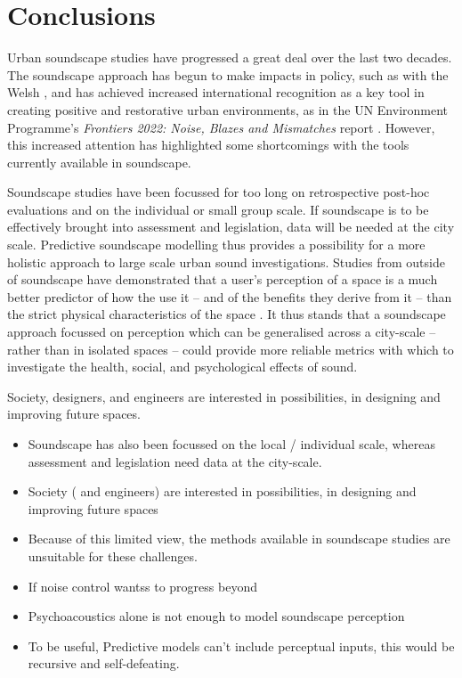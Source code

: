 \chapter{Conclusions}
\label{ch:conc}

Urban soundscape studies have progressed a great deal over the last two decades. The soundscape approach has begun to make impacts in policy, such as with the Welsh \citet{Welsh2018Noise}, and has achieved increased international recognition as a key tool in creating positive and restorative urban environments, as in the UN Environment Programme's \emph{Frontiers 2022: Noise, Blazes and Mismatches} report \citep{Aletta2022Frontiers}. However, this increased attention has highlighted some shortcomings with the tools currently available in soundscape. 

Soundscape studies have been focussed for too long on retrospective post-hoc evaluations and on the individual or small group scale. If soundscape is to be effectively brought into assessment and legislation, data will be needed at the city scale. Predictive soundscape modelling thus provides a possibility for a more holistic approach to large scale urban sound investigations. Studies from outside of soundscape have demonstrated that a user's perception of a space is a much better predictor of how the use it -- and of the benefits they derive from it -- than the strict physical characteristics of the space \citep{Kruize2019Exploring}. It thus stands that a soundscape approach focussed on perception which can be generalised across a city-scale -- rather than in isolated spaces -- could provide more reliable metrics with which to investigate the health, social, and psychological effects of sound.

Society, designers, and engineers are interested in possibilities, in designing and improving future spaces.




\begin{itemize}
  \item Soundscape has also been focussed on the local / individual scale, whereas assessment and legislation need data at the city-scale.
  \item Society ( and engineers) are interested in possibilities, in designing and improving future spaces
  \item Because of this limited view, the methods available in soundscape studies are unsuitable for these challenges.
  \item If noise control wantss to progress beyond
  \item Psychoacoustics alone is not enough to model soundscape perception
  \item To be useful, Predictive models can't include perceptual inputs, this would be recursive and self-defeating.
\end{itemize}



